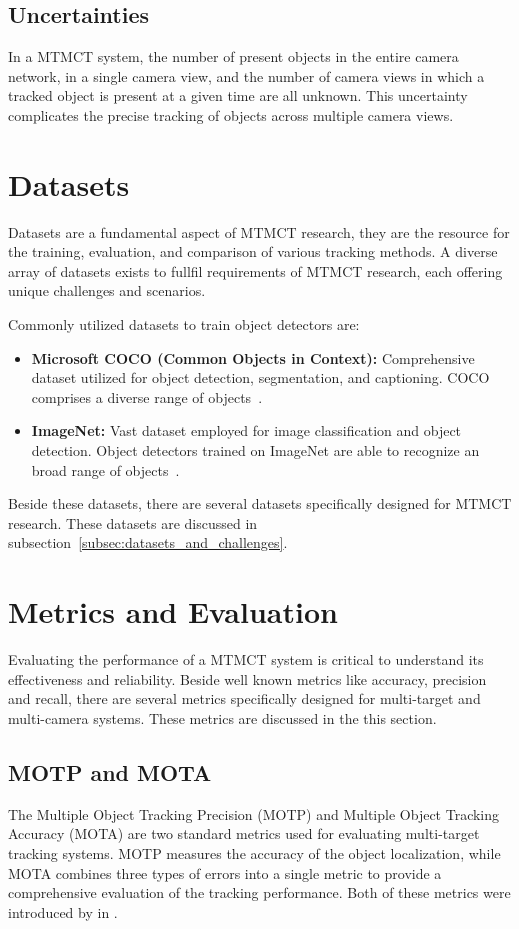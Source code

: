 \subsection{Uncertainties}\label{subsec:uncertainties}
In a MTMCT system, the number of present objects in the entire camera network, in a single camera view, and the number of camera views in which a tracked object is present at a given time are all unknown. This uncertainty complicates the precise tracking of objects across multiple camera views.

\section{Datasets}\label{sec:datasets}
Datasets are a fundamental aspect of MTMCT research, they are the resource for the training, evaluation, and comparison of various tracking methods. A diverse array of datasets exists to fullfil requirements of MTMCT research, each offering unique challenges and scenarios.

Commonly utilized datasets to train object detectors are:

\begin{itemize}
    \item \textbf{Microsoft COCO (Common Objects in Context):} Comprehensive dataset utilized for object detection, segmentation, and captioning. COCO comprises a diverse range of objects~\cite{Lin14}.
    \item \textbf{ImageNet:} Vast dataset employed for image classification and object detection. Object detectors trained on ImageNet are able to recognize an broad range of objects~\cite{Deng09}.
\end{itemize}

Beside these datasets, there are several datasets specifically designed for MTMCT research. These datasets are discussed in subsection~\ref{subsec:datasets_and_challenges}.

\section{Metrics and Evaluation}\label{sec:metrics_and_evaluation}
Evaluating the performance of a MTMCT system is critical to understand its effectiveness and reliability. Beside well known metrics like accuracy, precision and recall, there are several metrics specifically designed for multi-target and multi-camera systems. These metrics are discussed in the this section.

\subsection{MOTP and MOTA}\label{subsec:motp_mota}
The Multiple Object Tracking Precision (MOTP) and Multiple Object Tracking Accuracy (MOTA) are two standard metrics used for evaluating multi-target tracking systems. MOTP measures the accuracy of the object localization, while MOTA combines three types of errors into a single metric to provide a comprehensive evaluation of the tracking performance. Both of these metrics were introduced by \textcite{Bernardin08} in \citeyear{Bernardin08}.

